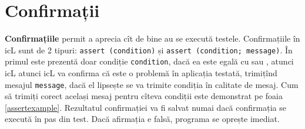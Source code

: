 \section{Confirmații}

{\bf Confirmațiile} permit a aprecia cît de bine au se execută testele. Confirmațiile în icL sunt de 2 tipuri: \texttt{assert (condition)} și \texttt{assert (condition; message)}. În primul este prezentă doar condiție \texttt{condition}, dacă ea este egală cu \false{} sau \void, atunci icL atunci icL va confirma că este o problemă în aplicația testată, trimițînd mesajul \texttt{message}, dacă el lipsește se va trimite condiția în calitate de mesaj. Cum să trimiți corect același mesaj pentru cîteva condiții este demonstrat pe foaia \ref{assertexample}. Rezultatul confirmației va fi salvat numai dacă confirmația se execută în pas din test. Dacă afirmația e falsă, programa se oprește imediat.

\begin{sourcecode}
    \label{assertexample}
    \inputminted[linenos]{icl}{../sources/assertexample.icL}
\end{sourcecode}
